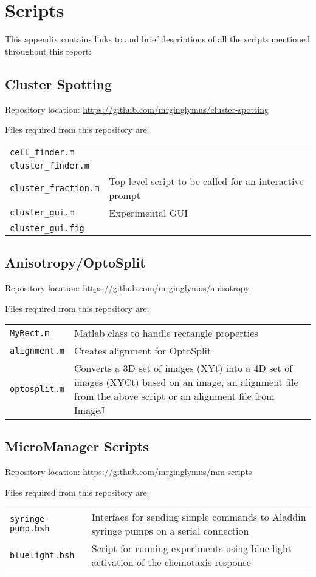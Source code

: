 \documentclass[../main.tex]{subfiles}
\begin{document}
\section{Scripts}

This appendix contains links to and brief descriptions of all the scripts mentioned throughout this report:

\subsection{Cluster Spotting}
\label{sec:scripts:clusters}
Repository location: \url{https://github.com/mrginglymus/cluster-spotting}

Files required from this repository are:


\begin{tabular}{ll}
\texttt{cell\_finder.m}	&	\\
\texttt{cluster\_finder.m}	&	\\
\texttt{cluster\_fraction.m}	&	Top level script to be called for an interactive prompt	\\
\texttt{cluster\_gui.m}		&	Experimental GUI \\
\texttt{cluster\_gui.fig}	&	
\end{tabular}

\subsection{Anisotropy/OptoSplit}
\label{sec:scripts:anisotropy}
Repository location: \url{https://github.com/mrginglymus/anisotropy}

Files required from this repository are:


\begin{tabular}{lp{12cm}}
\texttt{MyRect.m}	&	Matlab class to handle rectangle properties \\
\texttt{alignment.m}	&	Creates alignment for OptoSplit \\
\texttt{optosplit.m}	&	Converts a 3D set of images (XYt) into a 4D set of images (XYCt) based on an image, an alignment file from the above script or an alignment file from ImageJ
\end{tabular}

\subsection{MicroManager Scripts}
\label{sec:scripts:micromanager}

Repository location: \url{https://github.com/mrginglymus/mm-scripts}

Files required from this repository are:


\begin{tabular}{lp{12cm}}
\texttt{syringe-pump.bsh}	&	Interface for sending simple commands to Aladdin syringe pumps on a serial connection \\
\texttt{bluelight.bsh}	&	Script for running experiments using blue light activation of the chemotaxis response
\end{tabular}
\end{document}
